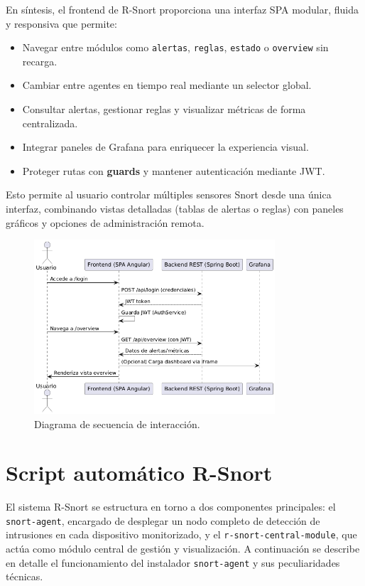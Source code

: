 \documentclass[11pt,a4paper,twoside]{report}
\begin{document}
En síntesis, el frontend de R-Snort proporciona una interfaz SPA modular, fluida y responsiva que permite:

\begin{itemize}
	\item Navegar entre módulos como \texttt{alertas}, \texttt{reglas}, \texttt{estado} o \texttt{overview} sin recarga.
	\item Cambiar entre agentes en tiempo real mediante un selector global.
	\item Consultar alertas, gestionar reglas y visualizar métricas de forma centralizada.
	\item Integrar paneles de Grafana para enriquecer la experiencia visual.
	\item Proteger rutas con \textbf{guards} y mantener autenticación mediante JWT.
\end{itemize}

Esto permite al usuario controlar múltiples sensores Snort desde una única interfaz, combinando vistas detalladas (tablas de alertas o reglas) con paneles gráficos y opciones de administración remota.

\begin{figure}[htb]
	\centering
	\includegraphics[width=0.8\textwidth]{documento/28.png}
	\caption{Diagrama de secuencia de interacción.}
	\label{fig:diagrama-secuencia-frontend}
\end{figure}

\section{Script automático R-Snort}

El sistema R-Snort se estructura en torno a dos componentes principales: el \texttt{snort-agent}, encargado de desplegar un nodo completo de detección de intrusiones en cada dispositivo monitorizado, y el \texttt{r-snort-central-module}, que actúa como módulo central de gestión y visualización. A continuación se describe en detalle el funcionamiento del instalador \texttt{snort-agent} y sus peculiaridades técnicas.
\end{document}
